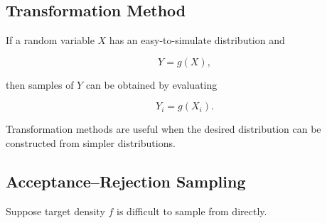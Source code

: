 
\subsection{Transformation Method}
\label{subsec:mc-transformation-method}

If a random variable \(X\) has an easy-to-simulate distribution and

\[
Y=g(X),
\]

then samples of \(Y\) can be obtained by evaluating

\[
\boxed{
Y_i=g(X_i).
}
\]

Transformation methods are useful when the desired distribution can be
constructed from simpler distributions.

\subsection{Acceptance--Rejection Sampling}
\label{subsec:acceptance-rejection}

Suppose target density \(f\) is difficult to sample from directly.

